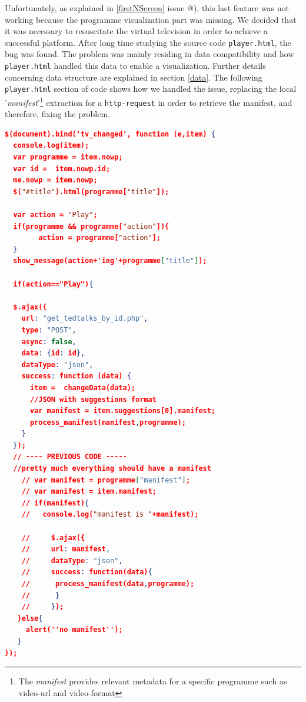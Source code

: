 \documentclass{acm_proc_article-sp}
\makeatletter
\newcommand*{\rom}[1]{\expandafter\@slowromancap\romannumeral #1@}
\makeatother
\begin{document}
Unfortunately, as explained in \ref{firstNScreen} issue \rom{4}), this last feature was not working because the programme visualization part was missing. We decided that it was necessary to resuscitate the virtual television in order to achieve a successful platform. After long time studying the source code \texttt{player.html}, the bug was found. The problem was mainly residing in data compatibility and how \texttt{player.html} handled this data to enable a visualization. Further details concerning data structure are explained in section \ref{data}. The following \texttt{player.html} section of code shows how we handled the issue, replacing the local '\textit{manifest}'\footnote{The \textit{manifest} provides relevant  metadata for a specific programme such as video-url and video-format} extraction for a \texttt{http-request} in order to retrieve the manifest, and therefore, fixing the problem. 
\begin{lstlisting}[language=json,firstnumber=1]
$(document).bind('tv_changed', function (e,item) {
  console.log(item);
  var programme = item.nowp;
  var id =  item.nowp.id;
  me.nowp = item.nowp;
  $("#title").html(programme["title"]);

  var action = "Play";
  if(programme && programme["action"]){
        action = programme["action"];
  }  
  show_message(action+'ing'+programme["title"]);

  if(action=="Play"){

  $.ajax({
    url: "get_tedtalks_by_id.php",
    type: "POST",
    async: false,
    data: {id: id},
    dataType: "json",
    success: function (data) {
      item =  changeData(data); 
      //JSON with suggestions format
      var manifest = item.suggestions[0].manifest;
      process_manifest(manifest,programme);
    }
  });
  // ---- PREVIOUS CODE -----
  //pretty much everything should have a manifest
    // var manifest = programme["manifest"];
    // var manifest = item.manifest;
    // if(manifest){
    //   console.log("manifest is "+manifest);
  
    //     $.ajax({
    //     url: manifest,
    //     dataType: "json",
    //     success: function(data){
    //      process_manifest(data,programme);
    //      }
    //     }); 
   }else{
     alert(''no manifest'');
   }
});
\end{lstlisting}
\end{document}
